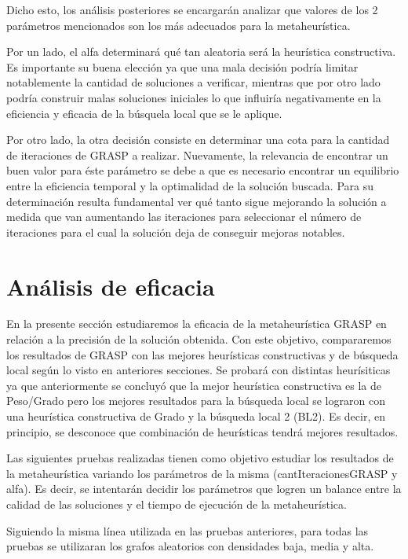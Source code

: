 \documentclass[a4paper,11pt] {article}
\begin{document}
Dicho esto, los análisis posteriores se encargarán analizar que valores de los 2 parámetros mencionados son los más adecuados para la metaheurística. 

Por un lado, el alfa determinará qué tan aleatoria será la heurística constructiva. Es importante su buena elección ya que una mala decisión podría limitar notablemente la cantidad de soluciones a verificar, mientras que por otro lado podría construir malas soluciones iniciales lo que influiría negativamente en la eficiencia y eficacia de la búsquela local que se le aplique.

Por otro lado, la otra decisión consiste en determinar una cota para la cantidad de iteraciones de GRASP a realizar. Nuevamente, la relevancia de encontrar un buen valor para éste parámetro se debe a que es necesario encontrar un equilibrio entre la eficiencia temporal y la optimalidad de la solución buscada. Para su determinación resulta fundamental ver qué tanto sigue mejorando la solución a medida que van aumentando las iteraciones para seleccionar el número de iteraciones para el cual la solución deja de conseguir mejoras notables.

\section*{An\'alisis de eficacia}

En la presente secci\'on estudiaremos la eficacia de la metaheur\'istica GRASP en relaci\'on a la precisi\'on de la soluci\'on obtenida. Con este objetivo, compararemos los resultados de GRASP con las mejores heur\'isticas constructivas y de b\'usqueda local seg\'un lo visto en anteriores secciones. Se probar\'a con distintas heur\'isiticas ya que anteriormente se concluy\'o que la mejor heur\'istica constructiva es la de Peso/Grado pero los mejores resultados para la b\'usqueda local se lograron con una heur\'istica constructiva de Grado y la b\'usqueda local 2 (BL2). Es decir, en principio, se desconoce que combinaci\'on de heur\'isticas tendr\'a mejores resultados. 

Las siguientes pruebas realizadas tienen como objetivo estudiar los resultados de la metaheur\'istica variando los par\'ametros de la misma (cantIteracionesGRASP y alfa). Es decir, se intentar\'an decidir los par\'ametros que logren un balance entre la calidad de las soluciones y el tiempo de ejecuci\'on de la metaheur\'istica.

Siguiendo la misma l\'inea utilizada en las pruebas anteriores, para todas las pruebas se utilizaran los grafos aleatorios con densidades baja, media y alta.
\end{document}
